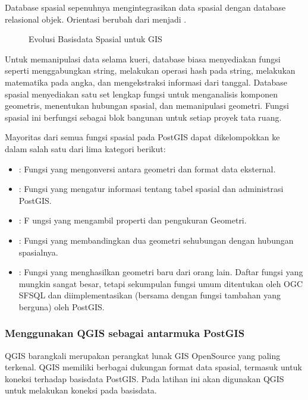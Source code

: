 \documentclass[letterpaper,10pt,english]{sphinxmanual}
\let\sphinxpxdimen\pdfpxdimen\else\newdimen\sphinxpxdimen
\begin{document}
Database spasial sepenuhnya mengintegrasikan data spasial dengan database relasional objek. Orientasi berubah dari  menjadi .

\begin{figure}[htbp]
\centering
\capstart

\noindent\sphinxincludegraphics[height=400\sphinxpxdimen]{{2020-12-03-07-15-37}.png}
\caption{Evolusi Basisdata Spasial untuk GIS}\label{\detokenize{sesi2/postgisquery:evolusi}}\end{figure}

Untuk memanipulasi data selama kueri, database biasa menyediakan fungsi seperti menggabungkan string, melakukan operasi hash pada string, melakukan matematika pada angka, dan mengekstraksi informasi dari tanggal. Database spasial menyediakan satu set lengkap fungsi untuk menganalisis komponen geometris, menentukan hubungan spasial, dan memanipulasi geometri. Fungsi spasial ini berfungsi sebagai blok bangunan untuk setiap proyek tata ruang.

Mayoritas dari semua fungsi spasial pada PostGIS dapat dikelompokkan ke dalam salah satu dari lima kategori berikut:
\begin{itemize}
\item {} 
: Fungsi yang mengonversi antara geometri dan format data eksternal.

\item {} 
: Fungsi yang mengatur informasi tentang tabel spasial dan administrasi PostGIS.

\item {} 
: F  ungsi yang mengambil properti dan pengukuran Geometri.

\item {} 
: Fungsi yang membandingkan dua geometri sehubungan dengan hubungan spasialnya.

\item {} 
: Fungsi yang menghasilkan geometri baru dari orang lain.
Daftar fungsi yang mungkin sangat besar, tetapi sekumpulan fungsi umum ditentukan oleh OGC SFSQL dan diimplementasikan (bersama dengan fungsi tambahan yang berguna) oleh PostGIS.

\end{itemize}


\subsubsection{Menggunakan QGIS sebagai antarmuka PostGIS}
\label{\detokenize{sesi2/postgisquery:menggunakan-qgis-sebagai-antarmuka-postgis}}
QGIS barangkali merupakan perangkat lunak GIS OpenSource yang paling terkenal. QGIS memiliki berbagai dukungan format data spasial, termasuk untuk koneksi terhadap basisdata PostGIS. Pada latihan ini akan digunakan QGIS untuk melakukan koneksi pada basisdata.
\end{document}
